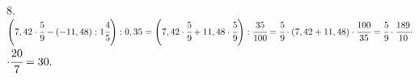 8. $\left(7,42\cdot\cfrac{5}{9}-(-11,48):1\cfrac{4}{5}\right):0,35=\left(7,42\cdot\cfrac{5}{9}+11,48\cdot\cfrac{5}{9}\right):\cfrac{35}{100}=
\cfrac{5}{9}\cdot\left(7,42+11,48\right)\cdot\cfrac{100}{35}=\cfrac{5}{9}\cdot\cfrac{189}{10}\cdot$\\$\cdot\cfrac{20}{7}=30.$\\
